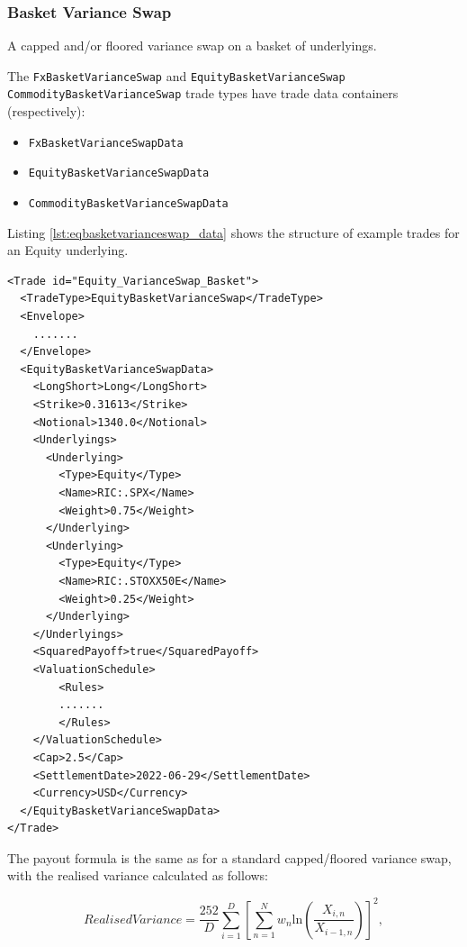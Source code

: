 \subsubsection{Basket Variance Swap}

A capped and/or floored variance swap on a basket of underlyings.

The \lstinline!FxBasketVarianceSwap! and \lstinline!EquityBasketVarianceSwap! \lstinline!CommodityBasketVarianceSwap! trade types
have trade data containers (respectively):
\begin{itemize}
  \item \lstinline!FxBasketVarianceSwapData!
  \item \lstinline!EquityBasketVarianceSwapData!
  \item \lstinline!CommodityBasketVarianceSwapData!
\end{itemize}
Listing \ref{lst:eqbasketvarianceswap_data} shows the structure of example trades for an Equity underlying.

\begin{listing}[H]
\begin{verbatim}
<Trade id="Equity_VarianceSwap_Basket">
  <TradeType>EquityBasketVarianceSwap</TradeType>
  <Envelope>
    .......
  </Envelope>
  <EquityBasketVarianceSwapData>
    <LongShort>Long</LongShort>
    <Strike>0.31613</Strike>
    <Notional>1340.0</Notional>
    <Underlyings>
      <Underlying>
        <Type>Equity</Type>
        <Name>RIC:.SPX</Name>
        <Weight>0.75</Weight>
      </Underlying>
      <Underlying>
        <Type>Equity</Type>
        <Name>RIC:.STOXX50E</Name>
        <Weight>0.25</Weight>
      </Underlying>
    </Underlyings>
    <SquaredPayoff>true</SquaredPayoff>
    <ValuationSchedule>
        <Rules>
        .......
        </Rules>
    </ValuationSchedule>
    <Cap>2.5</Cap>
    <SettlementDate>2022-06-29</SettlementDate>
    <Currency>USD</Currency>
  </EquityBasketVarianceSwapData>
</Trade>
\end{verbatim}
\caption{EquityBasketVarianceSwap data}
\label{lst:eqbasketvarianceswap_data}
\end{listing}

The payout formula is the same as for a standard capped/floored variance swap, with the
realised variance calculated as follows:

\begin{equation*}
  Realised Variance = \frac{252}{D} \sum_{i=1}^D \left[\sum_{n=1}^N w_n \text{ln}\left(\frac{X_{i,n}}{X_{i-1,n}}\right) \right]^2,
\end{equation*}

